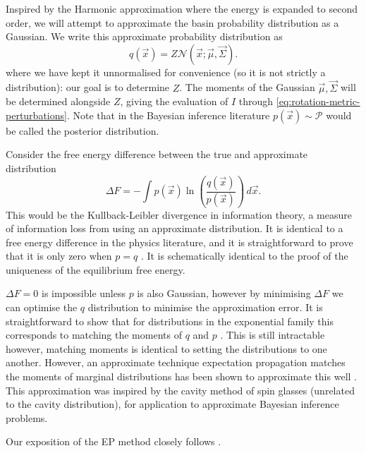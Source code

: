 \documentclass[11pt,twoside]{report}
\begin{document}
Inspired by the Harmonic approximation where the energy is expanded to second order, we will attempt to approximate the basin probability distribution as a Gaussian.
We write this approximate probability distribution as
\begin{equation}
  q(\vec{x}) = Z \mathcal{N}(\vec{x}; \vec{\mu}, \vec{\Sigma}).
\end{equation}
where we have kept it unnormalised for convenience (so it is not strictly a distribution): our goal is to determine $Z$.
The moments of the Gaussian $\vec{\mu}, \vec{\Sigma}$ will be determined alongside $Z$, giving the evaluation of $I$ through \eqref{eq:rotation-metric-perturbations}.
Note that in the Bayesian inference literature $p(\vec{x}) \sim \mathcal{P}$ would be called the posterior distribution.

Consider the free energy difference between the true and approximate distribution
\begin{equation}
  \Delta F
  =
  - \int p(\vec{x})
  \ln{\left( \frac{q(\vec{x})}{p(\vec{x})} \right)} \, d\vec{x}.
\end{equation}
This would be the Kullback-Leibler divergence in information theory, a measure of information loss from using an approximate distribution.
It is identical to a free energy difference in the physics literature, and it is straightforward to prove that it is only zero when $p = q$ \cite{MerminPR1965, EvansAP1979}.
It is schematically identical to the proof of the uniqueness of the equilibrium free energy.

$\Delta F = 0$ is impossible unless $p$ is also Gaussian, however by minimising $\Delta F$ we can optimise the $q$ distribution to minimise the approximation error.
It is straightforward to show that for distributions in the exponential family this corresponds to matching the moments of $q$ and $p$ \cite{Minka2001,MinkaUAI2001,Rasmussen2006,Cunningham2011}.
This is still intractable however, matching moments is identical to setting the distributions to one another.
However, an approximate technique expectation propagation matches the moments of marginal distributions has been shown to approximate this well \cite{Minka2001,MinkaUAI2001,Rasmussen2006,Cunningham2011}.
This approximation was inspired by the cavity method of spin glasses (unrelated to the cavity distribution), for application to approximate Bayesian inference problems.

Our exposition of the EP method closely follows \cite{Cunningham2011}.
\end{document}
